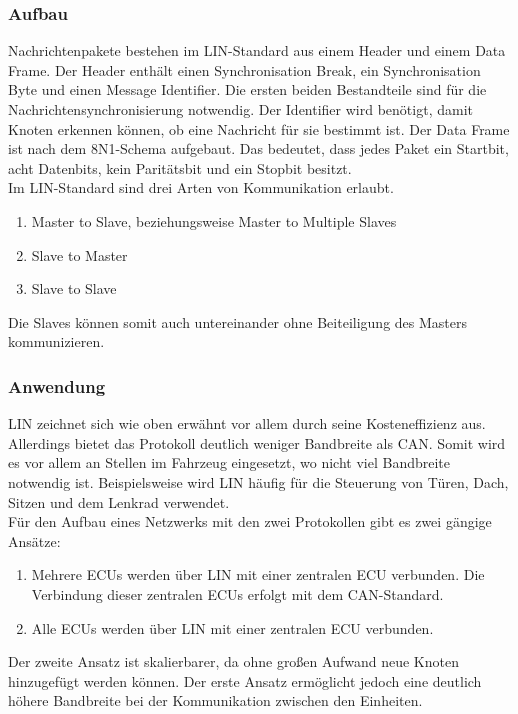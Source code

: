 \subsubsection{Aufbau}
Nachrichtenpakete bestehen im \acs{LIN}-Standard aus einem Header und einem Data Frame. Der Header enthält einen Synchronisation Break, ein Synchronisation Byte und einen Message Identifier. Die ersten beiden Bestandteile sind für die Nachrichtensynchronisierung notwendig. Der Identifier wird benötigt, damit Knoten erkennen können, ob eine Nachricht für sie bestimmt ist. Der Data Frame ist nach dem 8N1-Schema aufgebaut. Das bedeutet, dass jedes Paket ein Startbit, acht Datenbits, kein Paritätsbit und ein Stopbit besitzt. \cite[58]{Fijalkowski.2011} \\
Im \acs{LIN}-Standard sind drei Arten von Kommunikation erlaubt.
\begin{enumerate}
\item Master to Slave, beziehungsweise Master to Multiple Slaves
\item Slave to Master
\item Slave to Slave
\end{enumerate}
Die Slaves können somit auch untereinander ohne Beiteiligung des Masters kommunizieren. \cite[59]{Fijalkowski.2011}

\subsubsection{Anwendung}
\ac{LIN} zeichnet sich wie oben erwähnt vor allem durch seine Kosteneffizienz aus. Allerdings bietet das Protokoll deutlich weniger Bandbreite als \acs{CAN}. Somit wird es vor allem an Stellen im Fahrzeug eingesetzt, wo nicht viel Bandbreite notwendig ist. Beispielsweise wird \acs{LIN} häufig für die Steuerung von Türen, Dach, Sitzen und dem Lenkrad verwendet. \cite[59]{Fijalkowski.2011} \\
Für den Aufbau eines Netzwerks mit den zwei Protokollen gibt es zwei gängige Ansätze:
\begin{enumerate}
\item Mehrere \acsp{ECU} werden über \acs{LIN} mit einer zentralen \acs{ECU} verbunden. Die Verbindung dieser zentralen \acsp{ECU} erfolgt mit dem \acs{CAN}-Standard.
\item Alle \acsp{ECU} werden über \acs{LIN} mit einer zentralen \acs{ECU} verbunden.
\end{enumerate}
Der zweite Ansatz ist skalierbarer, da ohne großen Aufwand neue Knoten hinzugefügt werden können. Der erste Ansatz ermöglicht jedoch eine deutlich höhere Bandbreite bei der Kommunikation zwischen den Einheiten. \cite[58]{Fijalkowski.2011}


